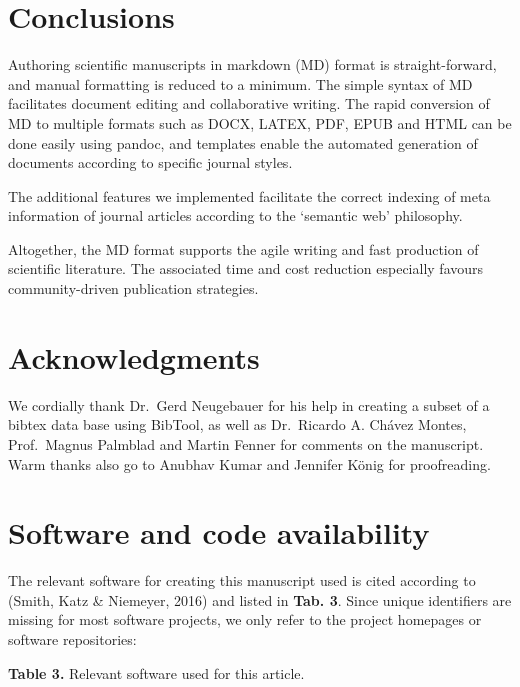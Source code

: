 \documentclass[10pt,fleqn]{wlpeerj}
\begin{document}
\section{Conclusions}\label{conclusions}

Authoring scientific manuscripts in markdown (MD) format is
straight-forward, and manual formatting is reduced to a minimum. The
simple syntax of MD facilitates document editing and collaborative
writing. The rapid conversion of MD to multiple formats such as DOCX,
LATEX, PDF, EPUB and HTML can be done easily using pandoc, and templates
enable the automated generation of documents according to specific
journal styles.

The additional features we implemented facilitate the correct indexing
of meta information of journal articles according to the `semantic web'
philosophy.

Altogether, the MD format supports the agile writing and fast production
of scientific literature. The associated time and cost reduction
especially favours community-driven publication strategies.

\section{Acknowledgments}\label{acknowledgments}

We cordially thank Dr.~Gerd Neugebauer for his help in creating a subset
of a bibtex data base using BibTool, as well as Dr.~Ricardo A. Chávez
Montes, Prof.~Magnus Palmblad and Martin Fenner for comments on the
manuscript. Warm thanks also go to Anubhav Kumar and Jennifer König for
proofreading.

\newpage

\section{Software and code
availability}\label{software-and-code-availability}

The relevant software for creating this manuscript used is cited
according to (Smith, Katz \& Niemeyer, 2016) and listed in \textbf{Tab.
3}. Since unique identifiers are missing for most software projects, we
only refer to the project homepages or software repositories:

\textbf{Table 3.} Relevant software used for this article.
\end{document}
